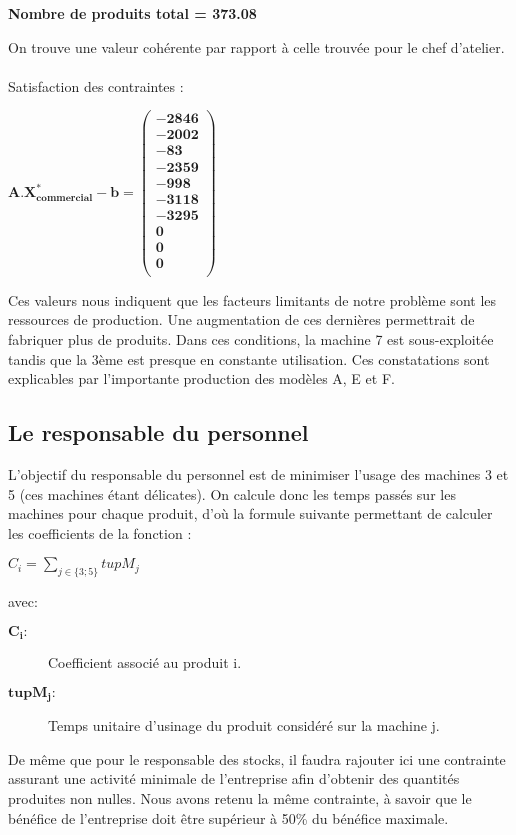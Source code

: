 \documentclass[12pt]{article}
\begin{document}
\begin{center}
\textbf{Nombre de produits total = 373.08}
\end{center}
On trouve une valeur cohérente par rapport à celle trouvée pour le chef d'atelier.\\
\\
Satisfaction des contraintes : 
\begin{center}
$\mathbf{A.X^{*}_{commercial} - b = 
   \left (
   \begin{array}{c}
      -2846 \\
      -2002 \\
      -83 \\
      -2359 \\
      -998 \\
      -3118 \\
      -3295 \\
      0 \\
      0 \\
      0\\
   \end{array}
   \right )
 } $ 
\end{center}
Ces valeurs nous indiquent que les facteurs limitants de notre problème sont les ressources de production. Une augmentation de ces dernières permettrait de fabriquer plus de produits.
Dans ces conditions, la machine 7 est sous-exploitée tandis que la 3ème est presque en constante utilisation. Ces constatations sont explicables par l'importante production des modèles A, E et F. 

\subsection{Le responsable du personnel}
L'objectif du responsable du personnel est de minimiser l'usage des machines 3 et 5 (ces machines étant délicates). 
On calcule donc les temps passés sur les machines pour chaque produit, d'où la formule suivante permettant de calculer les coefficients de la fonction : 
\begin{center} $ C_{i} = \sum_{j\in\lbrace3;5\rbrace}tupM_{j} $ \end{center} avec:
\begin{description}
\item[$\mathbf{C_{i} :}$] Coefficient associé au produit i.
\item[$\mathbf{tupM_{j} :}$] Temps unitaire d'usinage du produit considéré sur la machine j.
\end{description}
De même que pour le responsable des stocks, il faudra rajouter ici une contrainte assurant une  activité minimale de l'entreprise afin d'obtenir des quantités produites non nulles. Nous avons retenu la même contrainte, à savoir que le bénéfice de l'entreprise doit être supérieur à 50\% du bénéfice maximale.
 
\end{document}

